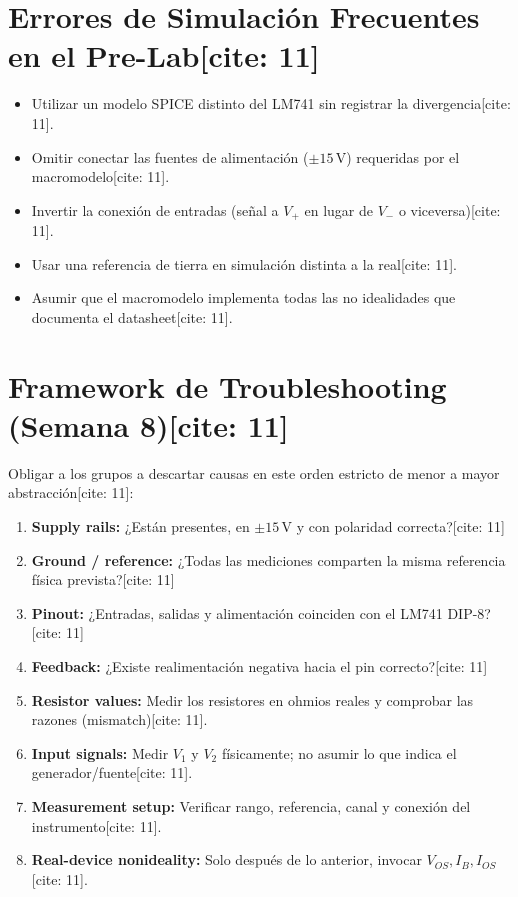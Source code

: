 \documentclass[11pt, a4paper]{article}
\begin{document}
\section*{Errores de Simulación Frecuentes en el Pre-Lab[cite: 11]}
\begin{itemize}
    \item Utilizar un modelo SPICE distinto del LM741 sin registrar la divergencia[cite: 11].
    \item Omitir conectar las fuentes de alimentación ($\pm15\,\text{V}$) requeridas por el macromodelo[cite: 11].
    \item Invertir la conexión de entradas (señal a $V_+$ en lugar de $V_-$ o viceversa)[cite: 11].
    \item Usar una referencia de tierra en simulación distinta a la real[cite: 11].
    \item Asumir que el macromodelo implementa todas las no idealidades que documenta el datasheet[cite: 11].
\end{itemize}

\section*{Framework de Troubleshooting (Semana 8)[cite: 11]}
Obligar a los grupos a descartar causas en este orden estricto de menor a mayor abstracción[cite: 11]:
\begin{enumerate}
    \item \textbf{Supply rails:} ¿Están presentes, en $\pm15\,\text{V}$ y con polaridad correcta?[cite: 11]
    \item \textbf{Ground / reference:} ¿Todas las mediciones comparten la misma referencia física prevista?[cite: 11]
    \item \textbf{Pinout:} ¿Entradas, salidas y alimentación coinciden con el LM741 DIP-8?[cite: 11]
    \item \textbf{Feedback:} ¿Existe realimentación negativa hacia el pin correcto?[cite: 11]
    \item \textbf{Resistor values:} Medir los resistores en ohmios reales y comprobar las razones (mismatch)[cite: 11].
    \item \textbf{Input signals:} Medir $V_1$ y $V_2$ físicamente; no asumir lo que indica el generador/fuente[cite: 11].
    \item \textbf{Measurement setup:} Verificar rango, referencia, canal y conexión del instrumento[cite: 11].
    \item \textbf{Real-device nonideality:} Solo después de lo anterior, invocar $V_{OS}, I_B, I_{OS}$[cite: 11].
\end{enumerate}
\end{document}
